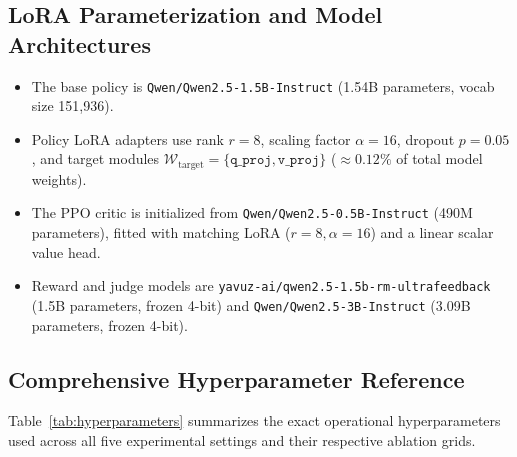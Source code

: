 \documentclass{article}
\begin{document}
\subsection{LoRA Parameterization and Model Architectures}
\begin{itemize}\setlength\itemsep{-0.2em}\vspace{-2mm}
  \item The base policy is \texttt{Qwen/Qwen2.5-1.5B-Instruct} (1.54B parameters, vocab size 151,936).
  \item Policy LoRA adapters use rank $r = 8$, scaling factor $\alpha = 16$, dropout $p = 0.05$, and target modules $\mathcal{W}_{\text{target}} = \{\texttt{q\_proj}, \texttt{v\_proj}\}$ ($\approx 0.12\%$ of total model weights).
  \item The PPO critic is initialized from \texttt{Qwen/Qwen2.5-0.5B-Instruct} (490M parameters), fitted with matching LoRA ($r = 8, \alpha = 16$) and a linear scalar value head.
  \item Reward and judge models are \texttt{yavuz-ai/qwen2.5-1.5b-rm-ultrafeedback} (1.5B parameters, frozen 4-bit) and \texttt{Qwen/Qwen2.5-3B-Instruct} (3.09B parameters, frozen 4-bit).
\end{itemize}\vspace{-3mm}

\subsection{Comprehensive Hyperparameter Reference}
Table~\ref{tab:hyperparameters} summarizes the exact operational hyperparameters used across all five experimental settings and their respective ablation grids.
\end{document}
